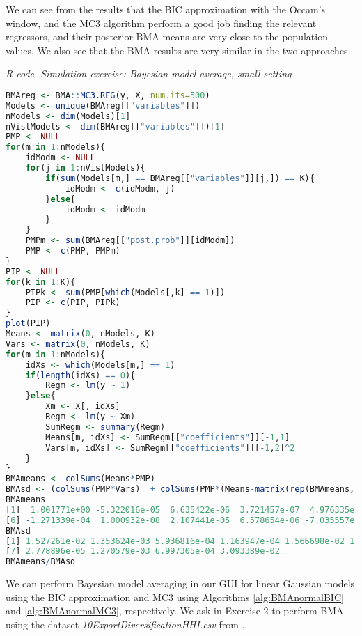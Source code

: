 We can see from the results that the BIC approximation with the Occam's window, and the MC3 algorithm perform a good job finding the relevant regressors, and their posterior BMA means are very close to the population values. We also see that the BMA results are very similar in the two approaches.

\begin{tcolorbox}[enhanced,width=4.67in,center upper,
	fontupper=\large\bfseries,drop shadow southwest,sharp corners]
	\textit{R code. Simulation exercise: Bayesian model average, small setting}
	\begin{VF}
		\begin{lstlisting}[language=R]
BMAreg <- BMA::MC3.REG(y, X, num.its=500)
Models <- unique(BMAreg[["variables"]])
nModels <- dim(Models)[1]
nVistModels <- dim(BMAreg[["variables"]])[1]
PMP <- NULL
for(m in 1:nModels){
	idModm <- NULL
	for(j in 1:nVistModels){
		if(sum(Models[m,] == BMAreg[["variables"]][j,]) == K){
			idModm <- c(idModm, j)
		}else{
			idModm <- idModm
		} 
	}
	PMPm <- sum(BMAreg[["post.prob"]][idModm])
	PMP <- c(PMP, PMPm)
}
PIP <- NULL
for(k in 1:K){
	PIPk <- sum(PMP[which(Models[,k] == 1)])
	PIP <- c(PIP, PIPk)
}
plot(PIP)
Means <- matrix(0, nModels, K)
Vars <- matrix(0, nModels, K)
for(m in 1:nModels){
	idXs <- which(Models[m,] == 1)
	if(length(idXs) == 0){
		Regm <- lm(y ~ 1)
	}else{
		Xm <- X[, idXs]
		Regm <- lm(y ~ Xm)
		SumRegm <- summary(Regm)
		Means[m, idXs] <- SumRegm[["coefficients"]][-1,1]
		Vars[m, idXs] <- SumRegm[["coefficients"]][-1,2]^2 
	} 
}
BMAmeans <- colSums(Means*PMP)
BMAsd <- (colSums(PMP*Vars)  + colSums(PMP*(Means-matrix(rep(BMAmeans, each = nModels), nModels, K))^2))^0.5
BMAmeans
[1]  1.001771e+00 -5.322016e-05  6.635422e-06  3.721457e-07  4.976335e-01
[6] -1.271339e-04  1.000932e-08  2.107441e-05  6.578654e-06 -7.035557e-01 
BMAsd
[1] 1.527261e-02 1.353624e-03 5.936816e-04 1.163947e-04 1.566698e-02 1.987360e-03
[7] 2.778896e-05 1.270579e-03 6.997305e-04 3.093389e-02
BMAmeans/BMAsd
\end{lstlisting}
	\end{VF}
\end{tcolorbox}

We can perform Bayesian model averaging in our GUI for linear Gaussian models using the BIC approximation and MC3 using Algorithms \ref{alg:BMAnormalBIC} and \ref{alg:BMAnormalMC3}, respectively. We ask in Exercise 2 to perform BMA using the dataset \textit{10ExportDiversificationHHI.csv} from \cite{Jetter2015}.  

